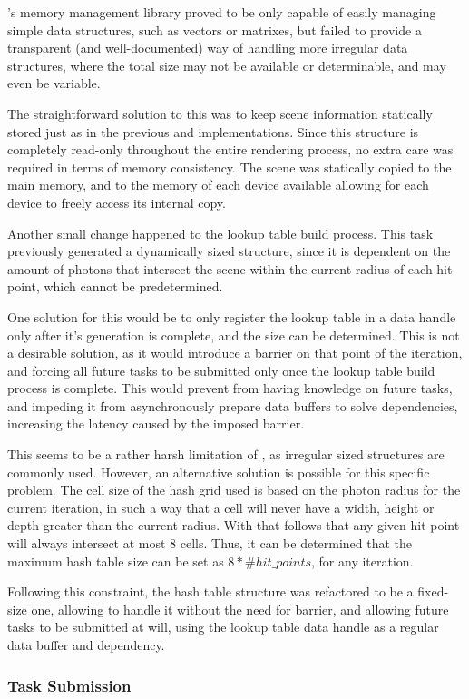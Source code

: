 \documentclass[main.tex]{subfiles}
\begin{document}
\starpu's memory management library proved to be only capable of easily managing simple data structures, such as vectors or matrixes, but failed to provide a transparent (and well-documented) way of handling more irregular data structures, where the total size may not be available or determinable, and may even be variable.

The straightforward solution to this was to keep scene information statically stored just as in the previous \cpu and \cuda implementations. Since this structure is completely read-only throughout the entire rendering process, no extra care was required in terms of memory consistency. The scene was statically copied to the main memory, and to the memory of each \cuda device available allowing for each device to freely access its internal copy.

Another small change happened to the lookup table build process. This task previously generated a dynamically sized structure, since it is dependent on the amount of photons that intersect the scene within the current radius of each hit point, which cannot be predetermined.

One solution for this would be to only register the lookup table in a \starpu data handle only after it's generation is complete, and the size can be determined. This is not a desirable solution, as it would introduce a barrier on that point of the iteration, and forcing all future tasks to be submitted only once the lookup table build process is complete. This would prevent \starpu from having knowledge on future tasks, and impeding it from asynchronously prepare data buffers to solve dependencies, increasing the latency caused by the imposed barrier.

This seems to be a rather harsh limitation of \starpu, as irregular sized structures are commonly used. However, an alternative solution is possible for this specific problem. The cell size of the hash grid used is based on the photon radius for the current iteration, in such a way that a cell will never have a width, height or depth greater than the current radius. With that follows that any given hit point will always intersect at most 8 cells. Thus, it can be determined that the maximum hash table size can be set as $8 * \#hit\_points$, for any iteration.

Following this constraint, the hash table structure was refactored to be a fixed-size one, allowing \starpu to handle it without the need for barrier, and allowing future tasks to be submitted at will, using the lookup table data handle as a regular data buffer and dependency.

\subsubsection{Task Submission}

\end{document}
